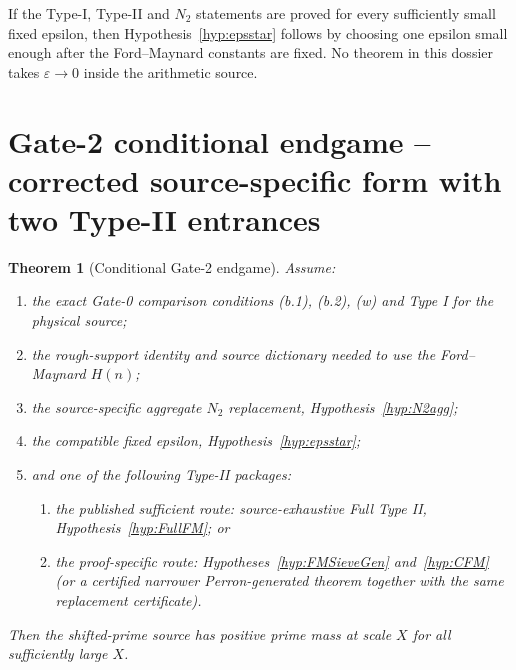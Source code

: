 \documentclass[11pt]{article}
\newtheorem{theorem}{Theorem}[section]
\theoremstyle{definition}
\theoremstyle{remark}
\newcommand{\1}{\mathbf 1}
\begin{document}
If the Type-I, Type-II and $N_2$ statements are proved for every sufficiently small fixed epsilon, then
Hypothesis~\ref{hyp:epsstar} follows by choosing one epsilon small enough after the Ford--Maynard constants are
fixed.  No theorem in this dossier takes $\varepsilon\to0$ inside the arithmetic source.


\section{Gate-2 conditional endgame -- corrected source-specific form with two Type-II entrances}

\begin{theorem}[Conditional Gate-2 endgame]\label{thm:Gate2}
Assume:
\begin{enumerate}[label=(\roman*)]
\item the exact Gate-0 comparison conditions (b.1), (b.2), (w) and Type I for the physical source;
\item the rough-support identity and source dictionary needed to use the Ford--Maynard $H(n)$;
\item the source-specific aggregate $N_2$ replacement, Hypothesis~\ref{hyp:N2agg};
\item the compatible fixed epsilon, Hypothesis~\ref{hyp:epsstar};
\item and \emph{one} of the following Type-II packages:
  \begin{enumerate}[label=(\alph*)]
  \item the published sufficient route: source-exhaustive Full Type II, Hypothesis~\ref{hyp:FullFM}; or
  \item the proof-specific route: Hypotheses~\ref{hyp:FMSieveGen} and~\ref{hyp:CFM} (or a certified narrower
  Perron-generated theorem together with the same replacement certificate).
  \end{enumerate}
\end{enumerate}
Then the shifted-prime source has positive prime mass at scale $X$ for all sufficiently large $X$.
\end{theorem}
\end{document}
